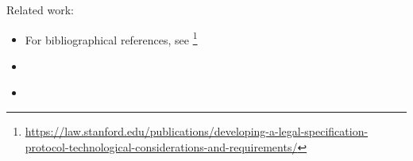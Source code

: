 Related work:

\begin{itemize}
\item For bibliographical references, see
  \footnote{\url{https://law.stanford.edu/publications/developing-a-legal-specification-protocol-technological-considerations-and-requirements/}}
\item \cite{libal_steen_nai_suite_draft_reason_legal_texts_jurix_2019}
\item \cite{governatori_carnead_defeas_logic_icail_2011}
\end{itemize}



